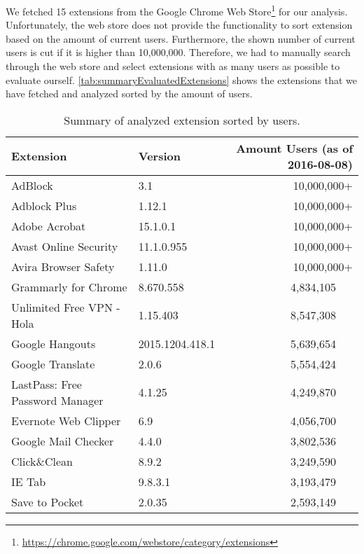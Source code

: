 	We fetched 15 extensions from the Google Chrome Web Store\footnote{\url{https://chrome.google.com/webstore/category/extensions}} for our analysis. Unfortunately, the web store does not provide the functionality to sort extension based on the amount of current users. Furthermore, the shown number of current users is cut if it is higher than 10,000,000. Therefore, we had to manually search through the web store and select extensions with as many users as possible to evaluate ourself. \autoref{tab:summaryEvaluatedExtensions} shows the extensions that we have fetched and analyzed sorted by the amount of users. %
	
	\begin{table}[h]
		\centering
		\begin{tabular}{|l|l|r|} \hline
			\textbf{Extension} & \textbf{Version} & \textbf{Amount Users} (as of 2016-08-08) \\ \hline
			AdBlock & 3.1 &  10,000,000+ \\ \hline
			Adblock Plus & 1.12.1 & 10,000,000+  \\ \hline
			Adobe Acrobat & 15.1.0.1 & 10,000,000+ \\ \hline
			Avast Online Security & 11.1.0.955 & 10,000,000+ \\ \hline
			Avira Browser Safety & 1.11.0 & 10,000,000+ \\ \hline
			Grammarly for Chrome & 8.670.558 & 4,834,105~~~ \\ \hline
			Unlimited Free VPN - Hola & 1.15.403 & 8,547,308~~~ \\ \hline
			Google Hangouts & 2015.1204.418.1 & 5,639,654~~~ \\ \hline
			Google Translate & 2.0.6 & 5,554,424~~~ \\ \hline
			LastPass: Free Password Manager & 4.1.25 & 4,249,870~~~ \\ \hline
			Evernote Web Clipper & 6.9 & 4,056,700~~~ \\ \hline
			Google Mail Checker & 4.4.0 & 3,802,536~~~ \\ \hline
			Click\&Clean & 8.9.2 & 3,249,590~~~  \\ \hline
			IE Tab & 9.8.3.1 & 3,193,479~~~ \\ \hline
			Save to Pocket & 2.0.35 & 2,593,149~~~ \\ \hline
		\end{tabular}
		\caption{Summary of analyzed extension sorted by users.}
		\label{tab:summaryEvaluatedExtensions}
	\end{table}
	
